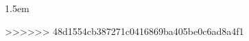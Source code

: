 %	
\usepackage{fancyhdr}

\headheight 35pt

\fancyhead[RE]{}
\fancyhead[LO]{}

\fancyfoot[L]{}
\fancyfoot[C]{\thepage}
\fancyfoot[R]{}

\headsep 1.5em

\pagestyle{fancy}
\thispagestyle{plain}
%	
\setlength{\parindent}{1em} %
\setlength{\parskip}{1em} %

\usepackage{csquotes}
\renewenvironment{quote}
{\footnotesize\list{}{\rightmargin=0cm \leftmargin=4cm}%
	\item\relax}
>>>>>>> 48d1554cb387271c0416869ba405be0c6ad8a4f1
{\endlist}